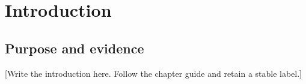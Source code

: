 \chapter{Introduction}
\label{chap:introduction}
\section{Purpose and evidence}
[Write the introduction here. Follow the chapter guide and retain a stable label.]

